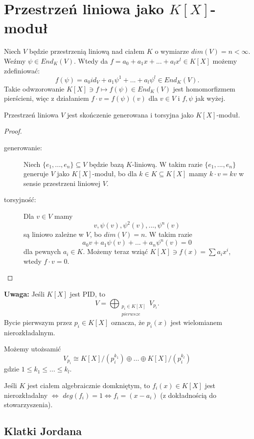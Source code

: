 \section{Przestrzeń liniowa jako $K[X]$-moduł}

Niech $V$ będzie przestrzenią liniową nad ciałem $K$ o wymiarze $dim(V)=n<\infty$. Weźmy $\psi\in End_K(V)$. Wtedy da $f=a_0+a_1x+...+a_lx^l\in K[X]$ możemy zdefiniować:
$$f(\psi)=a_0id_V+a_1\psi^1+...+a_l\psi^l\in End_K(V).$$
Takie odwzorowanie $K[X]\ni f\mapsto f(\psi)\in End_K(V)$ jest homomorfizmem pierścieni, więc  z działaniem $f\cdot v=f(\psi)(v)$ dla $v\in V$ i $f,\psi$ jak wyżej.

\begin{remark}
  Przestrzeń liniowa $V$ jest skończenie generowana i torsyjna jako $K[X]$-moduł.
\end{remark}

\begin{proof}
  \begin{description}
    \item[generowanie:] Niech $\{e_1,...,e_n\}\subseteq V$ będzie bazą $K$-liniową. W takim razie $\{e_1,...,e_n\}$ generuje $V$ jako $K[X]$-moduł, bo dla $k\in K\subseteq K[X]$ mamy $k\cdot v=kv$ w sensie przestrzeni liniowej $V$.
    \item[torsyjność:] Dla $v\in V$ mamy
      $$v, \psi(v),\psi^2(v),...,\psi^n(v)$$
      są liniowo zależne w $V$, bo $dim(V)=n$. W takim razie
      $$a_0v+a_1\psi(v)+...+a_n\psi^n(v)=0$$
      dla pewnych $a_i\in K$. Możemy teraz wziąć $K[X]\ni f(x)=\sum a_ix^i$, wtedy $f\cdot v=0$.
  \end{description}
\end{proof}

\textbf{\large\color{blue}Uwaga:} Jeśli $K[X]$ jest PID, to 
$$V=\bigoplus_{\substack{p_i\in K[X]\\pierwsze}} V_{p_i}.$$
Bycie pierwszym przez $p_i\in K[X]$ oznacza, że $p_i(x)$ jest wielomianem nierozkładalnym.

Możemy utożsamić
$$V_{p_i}\cong K[X]/(p_i^{k_1})\oplus...\oplus K[X]/(p_i^{k_l})$$
gdzie $1\leq k_1\leq ...\leq k_l$.

Jeśli $K$ jest ciałem algebraicznie domkniętym, to $f_i(x)\in K[X]$ jest nierozkładalny $\iff$ $deg(f_i)=1\iff f_i=(x-a_i)$ (z dokładnością do stowarzyszenia).

\subsection{Klatki Jordana}

